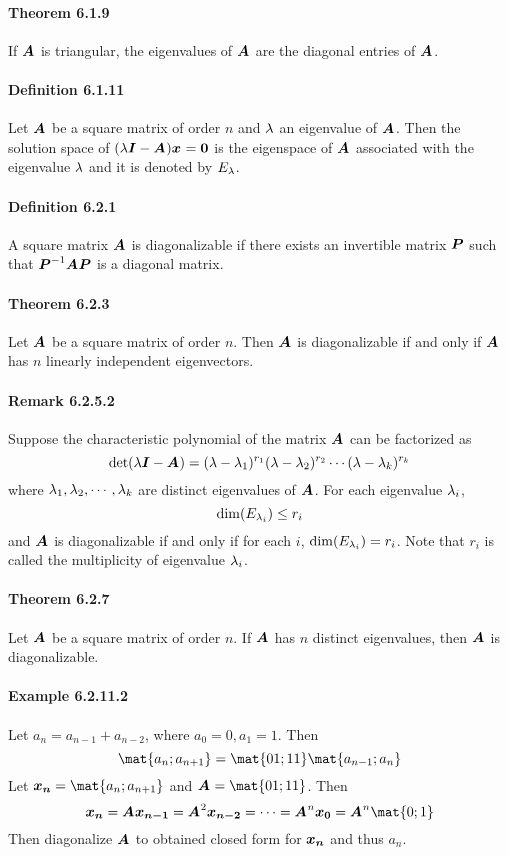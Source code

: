 \documentclass[a4paper]{article}
\newcommand{\inv}{^{-1}}
\begin{document}
\begin{multicols*}{3}
    \paragraph{Theorem 6.1.9} If $\A$ is triangular, the eigenvalues of $\A$ are the diagonal entries of $\A$.
    \paragraph{Definition 6.1.11} Let $\A$ be a square matrix of order $n$ and $\lm$ an eigenvalue of $\A$. Then the solution space of $(\lm\I-\A)\x=\vz$ is the eigenspace of $\A$ associated with the eigenvalue $\lm$ and it is denoted by $E_\lm$.
    \paragraph{Definition 6.2.1} A square matrix $\A$ is diagonalizable if there exists an invertible matrix $\P$ such that $\P\inv\A\P$ is a diagonal matrix.
    \paragraph{Theorem 6.2.3} Let $\A$ be a square matrix of order $n$. Then $\A$ is diagonalizable if and only if $\A$ has $n$ linearly independent eigenvectors.
    \paragraph{Remark 6.2.5.2} Suppose the characteristic polynomial of the matrix $\A$ can be factorized as
      \begin{equation*}
        \det(\lm\I-\A) = (\lm-\lm_1)^{r_1}(\lm-\lm_2)^{r_2} \cdots (\lm-\lm_k)^{r_k}
      \end{equation*}
      where $\lm_1, \lm_2, \cdots, \lm_k$ are distinct eigenvalues of $\A$. For each eigenvalue $\lm_i$,
      \begin{equation*}
        \matdim{E_{\lm_i}} \leq r_i
      \end{equation*}
      and $\A$ is diagonalizable if and only if for each $i$, $\matdim{E_{\lm_i}} = r_i$. Note that $r_i$ is called the multiplicity of eigenvalue $\lm_i$.
    \paragraph{Theorem 6.2.7} Let $\A$ be a square matrix of order $n$. If $\A$ has $n$ distinct eigenvalues, then $\A$ is diagonalizable.
    \paragraph{Example 6.2.11.2} Let $a_n = a_{n-1} + a_{n-2}$, where $a_0 = 0, a_1 = 1$. Then
      \begin{equation*}
        \mat{a_n; a_{n+1}} = \mat{0 1; 1 1} \mat{a_{n-1}; a_n}
      \end{equation*}
      Let $\x[n] = \mat{a_n; a_{n+1}}$ and $\A = \mat{0 1; 1 1}$. Then
      \begin{equation*}
        \x[n] = \A\x[n-1] = \A^2\x[n-2] = \cdots = \A^n\x[0] = \A^n \mat{0; 1}
      \end{equation*}
      Then diagonalize $\A$ to obtained closed form for $\x[n]$ and thus $a_n$.

\end{multicols*}
\end{document}
